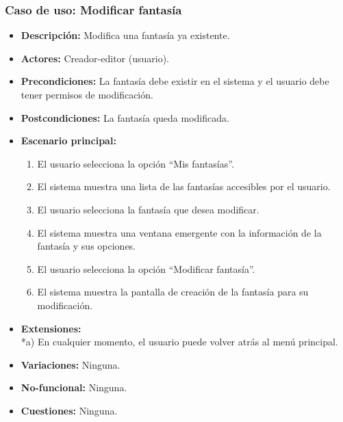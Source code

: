 \subsubsection{Caso de uso: Modificar fantasía}
\begin{itemize}
	\item \textbf{Descripción:} Modifica una fantasía ya existente.
	\item \textbf{Actores:} Creador-editor (usuario).
	\item \textbf{Precondiciones:} La fantasía debe existir en el sistema y el usuario debe tener permisos de modificación.
	\item \textbf{Postcondiciones:} La fantasía queda modificada.
	\item \textbf{Escenario principal:}
	\begin{enumerate}
		\item El usuario selecciona la opción ``Mis fantasías''.
		\item El sistema muestra una lista de las fantasías accesibles por el usuario.
		\item El usuario selecciona la fantasía que desea modificar.
		\item El sistema muestra una ventana emergente con la información de la fantasía y sus opciones.
		\item El usuario selecciona la opción ``Modificar fantasía''.
		\item El sistema muestra la pantalla de creación de la fantasía para su modificación.
	\end{enumerate}
	\item \textbf{Extensiones:} \\ *a) En cualquier momento, el usuario puede volver atrás al menú principal.
	\item \textbf{Variaciones:} Ninguna.
	\item \textbf{No-funcional:} Ninguna.
	\item \textbf{Cuestiones:} Ninguna.
\end{itemize}

